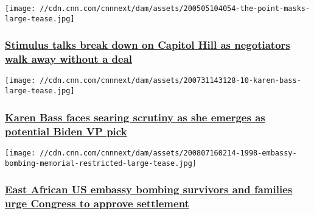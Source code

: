 \href{/2020/08/07/politics/stimulus-talks-coronavirus/index.html}{}

\texttt{[image: //cdn.cnn.com/cnnnext/dam/assets/200505104054-the-point-masks-large-tease.jpg]}

\hypertarget{stimulus-talks-break-down-on-capitol-hill-as-negotiators-walk-away-without-a-deal-}{%
\subsubsection{\texorpdfstring{\href{/2020/08/07/politics/stimulus-talks-coronavirus/index.html}{Stimulus
talks break down on Capitol Hill as negotiators walk away without a deal
}}{Stimulus talks break down on Capitol Hill as negotiators walk away without a deal }}\label{stimulus-talks-break-down-on-capitol-hill-as-negotiators-walk-away-without-a-deal-}}

\href{/2020/08/07/politics/karen-bass-scrutiny-biden-vice-presidential-pick/index.html}{}

\texttt{[image: //cdn.cnn.com/cnnnext/dam/assets/200731143128-10-karen-bass-large-tease.jpg]}

\hypertarget{karen-bass-faces-searing-scrutiny-as-she-emerges-as-potential-biden-vp-pick}{%
\subsubsection{\texorpdfstring{\href{/2020/08/07/politics/karen-bass-scrutiny-biden-vice-presidential-pick/index.html}{Karen
Bass faces searing scrutiny as she emerges as potential Biden VP
pick}}{Karen Bass faces searing scrutiny as she emerges as potential Biden VP pick}}\label{karen-bass-faces-searing-scrutiny-as-she-emerges-as-potential-biden-vp-pick}}

\href{/2020/08/07/politics/us-embassy-bombings-sudan-settlement/index.html}{}

\texttt{[image: //cdn.cnn.com/cnnnext/dam/assets/200807160214-1998-embassy-bombing-memorial-restricted-large-tease.jpg]}

\hypertarget{east-african-us-embassy-bombing-survivors-and-families-urge-congress-to-approve-settlement}{%
\subsubsection{\texorpdfstring{\href{/2020/08/07/politics/us-embassy-bombings-sudan-settlement/index.html}{East
African US embassy bombing survivors and families urge Congress to
approve
settlement}}{East African US embassy bombing survivors and families urge Congress to approve settlement}}\label{east-african-us-embassy-bombing-survivors-and-families-urge-congress-to-approve-settlement}}

